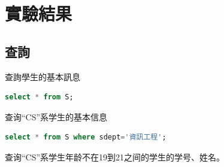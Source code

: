 \documentclass[12pt, a4paper]{report}
\begin{document}
\section{實驗結果}

\subsection{查詢}

查詢學生的基本訊息\\

\begin{lstlisting}[language=SQL]
    select * from S;
\end{lstlisting}

\begin{figure}[H] %
    \centering %
\end{figure}
查询“CS”系学生的基本信息\\

\begin{lstlisting}[language=SQL]
    select * from S where sdept='資訊工程';
\end{lstlisting}

\begin{figure}[H] %
    \centering %
\end{figure}
查询“CS”系学生年龄不在19到21之间的学生的学号、姓名。\\
\end{document}
